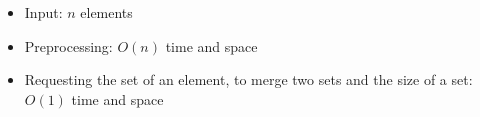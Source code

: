 \begin{itemize}
	\item Input: $n$ elements
	\item Preprocessing: $O(n)$ time and space
	\item Requesting the set of an element, to merge two sets and the size of a set: $O(1)$ time and space
\end{itemize}
